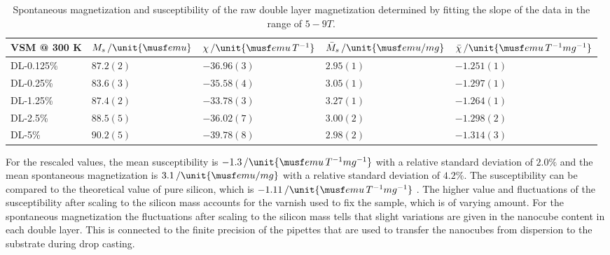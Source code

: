 \documentclass[\main/dresen_thesis.tex]{subfiles}
\begin{document}
    \begin{table}[!htbp]
      \centering
      \caption{\label{tab:doubleLayers:RTVSM:parameters} Spontaneous magnetization and susceptibility of the raw double layer magnetization determined by fitting the slope of the data in the range of $5 - 9 \unit{T}$.}
      \begin{tabular}{ l | l | l || l | l}
        \rule{0pt}{2ex} \textbf{VSM @ 300 K}  & $M_s \, / \unit{\musf emu}$ & $\chi \, / \unit{\musf emu \, T ^{-1}}$ & $\bar{M}_s \, / \unit{\musf emu / mg}$ & $\bar{\chi} \, / \unit{\musf emu \, T ^{-1} mg^{-1}}$ \\
        \hline
        \rule{0pt}{2ex} DL-0.125\%   & $87.2(2)$   & $-36.96(3)$ & $2.95(1)$ & $-1.251(1)$\\
        \rule{0pt}{2ex} DL-0.25\%    & $83.6(3)$   & $-35.58(4)$ & $3.05(1)$ & $-1.297(1)$\\
        \rule{0pt}{2ex} DL-1.25\%    & $87.4(2)$   & $-33.78(3)$ & $3.27(1)$ & $-1.264(1)$\\
        \rule{0pt}{2ex} DL-2.5\%     & $88.5(5)$   & $-36.02(7)$ & $3.00(2)$ & $-1.298(2)$\\
        \rule{0pt}{2ex} DL-5\%       & $90.2(5)$   & $-39.78(8)$ & $2.98(2)$ & $-1.314(3)$\\
        \hline
      \end{tabular}
    \end{table}

    For the rescaled values, the mean susceptibility is $-1.3\, / \unit{\musf emu \, T ^{-1} mg^{-1}}$ with a relative standard deviation of $2.0 \%$  and the mean spontaneous magnetization is $3.1 \, / \unit{\musf emu / mg}$ with a relative standard deviation of $4.2 \%$.
    The susceptibility can be compared to the theoretical value of pure silicon, which is $-1.11\, / \unit{\musf emu \, T ^{-1} mg^{-1}}$ \cite{Lide_2004_Handb}.
    The higher value and fluctuations of the susceptibility after scaling to the silicon mass accounts for the varnish used to fix the sample, which is of varying amount.
    For the spontaneous magnetization the fluctuations after scaling to the silicon mass tells that slight variations are given in the nanocube content in each double layer.
    This is connected to the finite precision of the pipettes that are used to transfer the nanocubes from dispersion to the substrate during drop casting.
\end{document}
